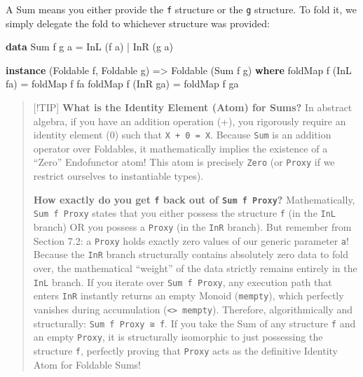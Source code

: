 \documentclass[
]{article}
\newenvironment{Shaded}{}{}
\newcommand{\DataTypeTok}[1]{\textcolor[rgb]{0.56,0.13,0.00}{#1}}
\newcommand{\FunctionTok}[1]{\textcolor[rgb]{0.02,0.16,0.49}{#1}}
\newcommand{\KeywordTok}[1]{\textcolor[rgb]{0.00,0.44,0.13}{\textbf{#1}}}
\newcommand{\NormalTok}[1]{#1}
\newcommand{\OperatorTok}[1]{\textcolor[rgb]{0.40,0.40,0.40}{#1}}
\newcommand{\OtherTok}[1]{\textcolor[rgb]{0.00,0.44,0.13}{#1}}
\begin{document}
A Sum means you either provide the \texttt{f} structure or the
\texttt{g} structure. To fold it, we simply delegate the fold to
whichever structure was provided:

\begin{Shaded}
\begin{Highlighting}[]
\KeywordTok{data} \DataTypeTok{Sum}\NormalTok{ f g a }\OtherTok{=} \DataTypeTok{InL}\NormalTok{ (f a) }\OperatorTok{|} \DataTypeTok{InR}\NormalTok{ (g a)}

\KeywordTok{instance}\NormalTok{ (}\DataTypeTok{Foldable}\NormalTok{ f, }\DataTypeTok{Foldable}\NormalTok{ g) }\OtherTok{=\textgreater{}} \DataTypeTok{Foldable}\NormalTok{ (}\DataTypeTok{Sum}\NormalTok{ f g) }\KeywordTok{where}
    \FunctionTok{foldMap}\NormalTok{ f (}\DataTypeTok{InL}\NormalTok{ fa) }\OtherTok{=} \FunctionTok{foldMap}\NormalTok{ f fa}
    \FunctionTok{foldMap}\NormalTok{ f (}\DataTypeTok{InR}\NormalTok{ ga) }\OtherTok{=} \FunctionTok{foldMap}\NormalTok{ f ga}
\end{Highlighting}
\end{Shaded}

\begin{quote}
{[}!TIP{]} \textbf{What is the Identity Element (Atom) for Sums?} In
abstract algebra, if you have an addition operation (+), you rigorously
require an identity element (0) such that \texttt{X\ +\ 0\ =\ X}.
Because \texttt{Sum} is an addition operator over Foldables, it
mathematically implies the existence of a ``Zero'' Endofunctor atom!
This atom is precisely \texttt{Zero} (or \texttt{Proxy} if we restrict
ourselves to instantiable types).

\textbf{How exactly do you get \texttt{f} back out of
\texttt{Sum\ f\ Proxy}?} Mathematically, \texttt{Sum\ f\ Proxy} states
that you either possess the structure \texttt{f} (in the \texttt{InL}
branch) OR you possess a \texttt{Proxy} (in the \texttt{InR} branch).
But remember from Section 7.2: a \texttt{Proxy} holds exactly zero
values of our generic parameter \texttt{a}! Because the \texttt{InR}
branch structurally contains absolutely zero data to fold over, the
mathematical ``weight'' of the data strictly remains entirely in the
\texttt{InL} branch. If you iterate over \texttt{Sum\ f\ Proxy}, any
execution path that enters \texttt{InR} instantly returns an empty
Monoid (\texttt{mempty}), which perfectly vanishes during accumulation
(\texttt{\textless{}\textgreater{}\ mempty}). Therefore, algorithmically
and structurally: \texttt{Sum\ f\ Proxy\ ≅\ f}. If you take the Sum of
any structure \texttt{f} and an empty \texttt{Proxy}, it is structurally
isomorphic to just possessing the structure \texttt{f}, perfectly
proving that \texttt{Proxy} acts as the definitive Identity Atom for
Foldable Sums!
\end{quote}
\end{document}
